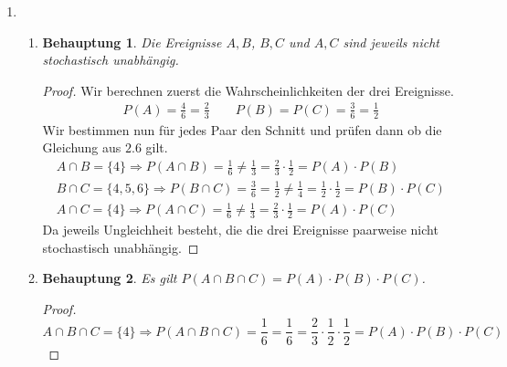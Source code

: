 \documentclass[a4paper]{scrartcl}
\newtheorem*{behaupt}{Behauptung}
\begin{document}
\begin{enumerate}[label=\bfseries\arabic*.]
    \item	        
        \begin{enumerate}[label=(\alph*)]
            \item
                \begin{behaupt}
                    Die Ereignisse $A, B$, $B, C$ und $A, C$ sind jeweils nicht
                    stochastisch unabhängig.
                \end{behaupt}
                \begin{proof}
                Wir berechnen zuerst die Wahrscheinlichkeiten der drei
                Ereignisse.
                \begin{align*}
                    P(A) = \frac{4}{6} = \frac{2}{3}
                    \qquad
                    P(B) = P(C) = \frac{3}{6} = \frac{1}{2}
                \end{align*}
                Wir bestimmen nun für jedes Paar den Schnitt und prüfen dann ob
                die Gleichung aus $2.6$ gilt.
                \begin{gather*}
                    A \cap B = \{4\} \Rightarrow P(A \cap B) = \frac{1}{6} \neq
                    \frac{1}{3} = \frac{2}{3} \cdot \frac{1}{2}
                    = P(A) \cdot P(B)
                    \\
                    B \cap C =\{4,5,6\} \Rightarrow P(B \cap C) = \frac{3}{6} =
                    \frac{1}{2} \neq \frac{1}{4} = \frac{1}{2} \cdot \frac{1}{2}
                    = P(B) \cdot P(C)
                    \\
                    A \cap C = \{4\} \Rightarrow P(A \cap C) = \frac{1}{6} \neq
                    \frac{1}{3} = \frac{2}{3} \cdot \frac{1}{2}
                    = P(A) \cdot P(C)
                \end{gather*}
                Da jeweils Ungleichheit besteht, die die drei Ereignisse
                paarweise nicht stochastisch unabhängig.
                \end{proof}
                
            \item
                \begin{behaupt}
                    Es gilt $P(A \cap B \cap C) = P(A) \cdot P(B) \cdot P(C)$.
                \end{behaupt}
                \begin{proof}
                    \begin{equation*}
                        A \cap B \cap C = \{4\} \Rightarrow P(A\cap B\cap C)
                        = \frac{1}{6} = \frac{1}{6} = \frac{2}{3}
                        \cdot \frac{1}{2} \cdot \frac{1}{2}
                        = P(A) \cdot P(B) \cdot P(C)
                    \end{equation*}
                \end{proof}
                

\end{enumerate}
\end{enumerate}
\end{document}
